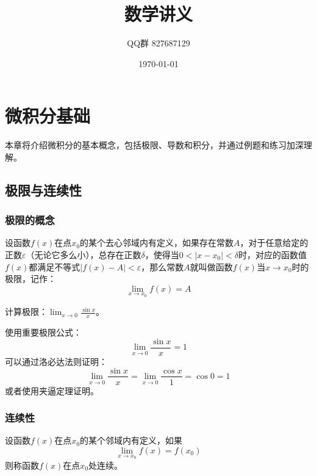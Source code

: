 \documentclass[oneside]{book}
\begin{document}
\title{数学讲义}
\author{QQ群 827687129}
\date{\today}

\maketitle

\tableofcontents


\chapter{微积分基础}

本章将介绍微积分的基本概念，包括极限、导数和积分，并通过例题和练习加深理解。

\newpage

\section{极限与连续性}

\subsection{极限的概念}

\begin{definition}
设函数$f(x)$在点$x_0$的某个去心邻域内有定义，如果存在常数$A$，对于任意给定的正数$\varepsilon$（无论它多么小），总存在正数$\delta$，使得当$0<|x-x_0|<\delta$时，对应的函数值$f(x)$都满足不等式$|f(x)-A|<\varepsilon$，那么常数$A$就叫做函数$f(x)$当$x \to x_0$时的极限，记作：
\[
\lim_{x \to x_0} f(x) = A
\]
\end{definition}

\begin{example}[基本极限计算]
计算极限：$\displaystyle \lim_{x \to 0} \frac{\sin x}{x}$。
\end{example}

\begin{answer}
使用重要极限公式：
\[
\lim_{x \to 0} \frac{\sin x}{x} = 1
\]
可以通过洛必达法则证明：
\[
\lim_{x \to 0} \frac{\sin x}{x} = \lim_{x \to 0} \frac{\cos x}{1} = \cos 0 = 1
\]
或者使用夹逼定理证明。
\end{answer}

\subsection{连续性}

\begin{definition}[函数连续性]
设函数$f(x)$在点$x_0$的某个邻域内有定义，如果
\[
\lim_{x \to x_0} f(x) = f(x_0)
\]
则称函数$f(x)$在点$x_0$处连续。
\end{definition}
\end{document}
